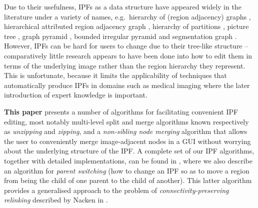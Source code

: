 \documentclass[10pt,twocolumn,twoside]{IEEEtran}
\begin{document}
Due to their usefulness, IPFs as a data structure have appeared widely in the literature under a variety of names, e.g.~hierarchy of (region adjacency) graphs \cite{kropatsch04,nacken95,shen97}, hierarchical attributed region adjacency graph \cite{fischer04}, hierarchy of partitions \cite{haxhimusa03,lezoray06}, picture tree \cite{andrade03}, graph pyramid \cite{kerren06}, bounded irregular pyramid \cite{marfil07} and segmentation graph \cite{borenstein06}. However, IPFs can be hard for users to change due to their tree-like structure -- comparatively little research appears to have been done into how to edit them in terms of the underlying image rather than the region hierarchy they represent. This is unfortunate, because it limits the applicability of techniques that automatically produce IPFs in domains such as medical imaging where the later introduction of expert knowledge is important.

\textbf{This paper} presents a number of algorithms for facilitating convenient IPF editing, most notably multi-level split and merge algorithms known respectively as \emph{unzipping} and \emph{zipping}, and a \emph{non-sibling node merging} algorithm that allows the user to conveniently merge image-adjacent nodes in a GUI without worrying about the underlying structure of the IPF. A complete set of our IPF algorithms, together with detailed implementations, can be found in \cite{golodetz11}, where we also describe an algorithm for \emph{parent switching} (how to change an IPF so as to move a region from being the child of one parent to the child of another). This latter algorithm provides a generalised approach to the problem of \emph{connectivity-preserving relinking} described by Nacken in \cite{nacken95}.

\end{document}
